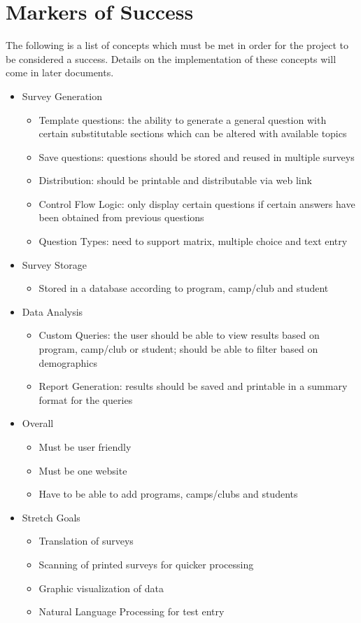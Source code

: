 \documentclass[draftclsnofoot,onecolumn,notitlepage]{article}
\begin{document}
\section{Markers of Success}
The following is a list of concepts which must be met in order for the project to be considered a success. Details on the implementation of these concepts will come in later documents. \\
\begin{itemize}
\item Survey Generation
\begin{itemize}
\item Template questions: the ability to generate a general question with certain substitutable sections which can be altered with available topics
\item Save questions: questions should be stored and reused in multiple surveys
\item Distribution: should be printable and distributable via web link
\item Control Flow Logic: only display certain questions if certain answers have been obtained from previous questions
\item Question Types: need to support matrix, multiple choice and text entry 
\end{itemize}
\item Survey Storage
\begin{itemize}
\item Stored in a database according to program, camp/club and student
\end{itemize}
\item Data Analysis
\begin{itemize}
\item Custom Queries: the user should be able to view results based on program, camp/club or student; should be able to filter based on demographics
\item Report Generation: results should be saved and printable in a summary format for the queries
\end{itemize}
\item Overall
\begin{itemize}
\item Must be user friendly
\item Must be one website
\item Have to be able to add programs, camps/clubs and students
\end{itemize}
\item Stretch Goals
\begin{itemize}
\item Translation of surveys
\item Scanning of printed surveys for quicker processing
\item Graphic visualization of data
\item Natural Language Processing for test entry
\end{itemize}
\end{itemize}
\end{document}
